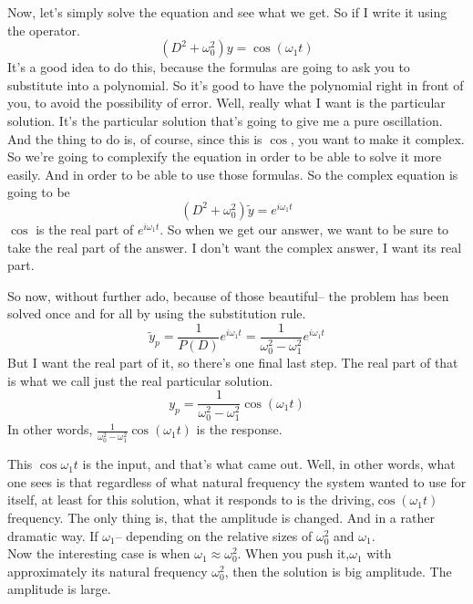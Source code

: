 Now, let's simply solve the equation and see what we get.
So if I write it using the operator.
\begin{equation*}
  (D^2 + \omega _0 ^2)y =  \cos (\omega _1 t)
\end{equation*}
It's a good idea to do this, because the formulas
are going to ask you to substitute into a polynomial.
So it's good to have the polynomial right
in front of you, to avoid the possibility of error.
Well, really what I want is the particular solution.
It's the particular solution that's
going to give me a pure oscillation.
And the thing to do is, of course, since this is $\cos$,
you want to make it complex.
So we're going to complexify the equation in order
to be able to solve it more easily.
And in order to be able to use those formulas.
So the complex equation is going to be
\begin{equation*}
  (D^2 + \omega _0 ^2) \tilde y =  e^{i \omega _1 t}
\end{equation*}
$\cos$ is the real part of $e^{i \omega _1 t}$.
So when we get our answer, we want
to be sure to take the real part of the answer.
I don't want the complex answer, I want its real part.

So now, without further ado, because of those beautiful--
the problem has been solved once and for all by using the substitution rule.
\begin{equation*}
  \tilde y_ p = \frac{1}{P(D)} e^{i \omega _1 t}
  = \frac{1}{\omega _0 ^2 - \omega _1 ^2} e^{i \omega _1 t}
\end{equation*}
But I want the real part of it, so there's one final last step.
The real part of that is what we call just
the real particular solution.
\begin{equation*}
  y_ p = \frac{1}{\omega _0 ^2 - \omega _1 ^2} \cos (\omega _1 t)
\end{equation*}
In other words, $\frac{1}{\omega _0 ^2 - \omega _1 ^2} \cos (\omega _1 t)$ is  the response.

This $\cos \omega _1 t$ is the input, and  that's what came out.
Well, in other words, what one sees
is that regardless of what natural frequency
the system wanted to use for itself, at least
for this solution, what it responds to is the driving,$\cos (\omega _1 t)$ frequency.
The only thing is, that the amplitude is changed.
And in a rather dramatic way.
If $\omega_ 1$-- depending on the relative sizes
of $\omega_ 0 ^2$ and $\omega_ 1$.\\

Now the interesting case is when $\omega_ 1 \approx \omega _0 ^2$.
When you push it,$\omega_ 1$ with approximately its natural frequency $\omega _0 ^2$,
then the solution is big amplitude. The amplitude is large.\\

